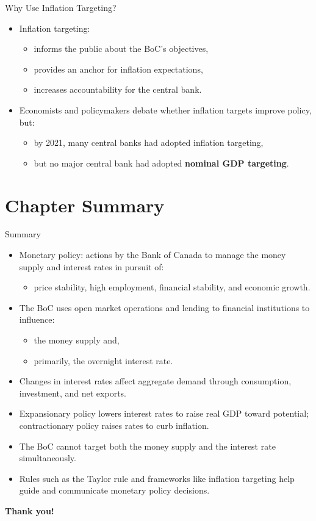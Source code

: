 \documentclass[aspectratio=169]{beamer}
\begin{document}
\begin{frame}{Why Use Inflation Targeting?}
\transfade
\begin{itemize}[<+->]
  \item Inflation targeting:
  \begin{itemize}[<+->]
    \item informs the public about the BoC’s objectives,
    \item provides an \alert{anchor} for inflation expectations,
    \item increases accountability for the central bank.
  \end{itemize}
  \item Economists and policymakers debate whether inflation targets improve policy, but:
  \begin{itemize}[<+->]
    \item by 2021, many central banks had adopted inflation targeting,
    \item but no major central bank had adopted \textbf{nominal GDP targeting}.
  \end{itemize}
\end{itemize}
\end{frame}

\section*{Chapter Summary}

\begin{frame}{Summary}
\transfade
\begin{itemize}[<+->]
  \item Monetary policy: actions by the Bank of Canada to manage the money supply and interest rates in pursuit of:
  \begin{itemize}[<+->]
    \item price stability, high employment, financial stability, and economic growth.
  \end{itemize}
  \item The BoC uses open market operations and lending to financial institutions to influence:
  \begin{itemize}[<+->]
    \item the money supply and,
    \item primarily, the overnight interest rate.
  \end{itemize}
  \item Changes in interest rates affect aggregate demand through consumption, investment, and net exports.
  \item Expansionary policy lowers interest rates to raise real GDP toward potential; contractionary policy raises rates to curb inflation.
  \item The BoC cannot target both the money supply and the interest rate simultaneously.
  \item Rules such as the Taylor rule and frameworks like inflation targeting help guide and communicate monetary policy decisions.
\end{itemize}
\end{frame}

\begin{frame}
\centering
\Huge \textbf{Thank you!}
\end{frame}
\end{document}
